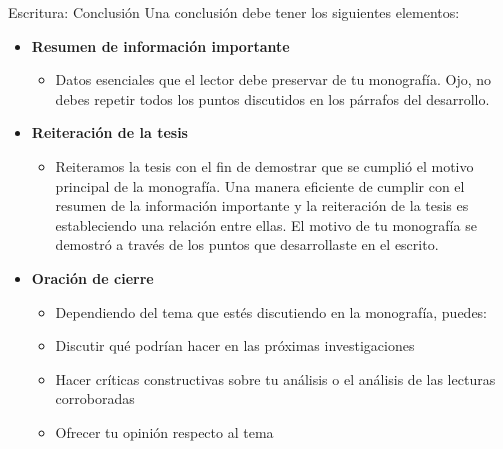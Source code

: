 \documentclass[
11pt, %
]{beamer}
\begin{document}
\begin{frame}{Escritura: Conclusión}
	Una conclusión debe tener los siguientes elementos:
	\begin{itemize}
		\item  \textbf{Resumen de información importante}
		      \begin{itemize}
			      \item Datos esenciales que el lector debe preservar de tu monografía. Ojo, no debes repetir todos los puntos discutidos en los párrafos del desarrollo.
		      \end{itemize}
		\item \textbf{Reiteración de la tesis}
		      \begin{itemize}
			      \item Reiteramos la tesis con el fin de demostrar que se cumplió el motivo principal
			            de la monografía. Una manera eficiente de cumplir con el resumen de la
			            información importante y la reiteración de la tesis es estableciendo una
			            relación entre ellas. El motivo de tu monografía se demostró a través de los
			            puntos que desarrollaste en el escrito.
		      \end{itemize}
		\item \textbf{Oración de cierre}
		      \begin{itemize}
			      \item Dependiendo del tema que estés discutiendo en la monografía, puedes:
			      \item Discutir qué podrían hacer en las próximas investigaciones
			      \item Hacer críticas constructivas sobre tu análisis o el análisis de las lecturas corroboradas
			      \item Ofrecer tu opinión respecto al tema
		      \end{itemize}
	\end{itemize}
\end{frame}
\end{document}
